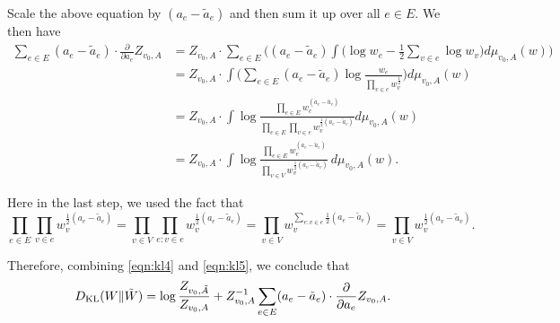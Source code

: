 \documentclass[a4paper, 11pt]{article}
\newcommand{\dkl}{D_{\textnormal{KL}}}
\begin{document}
Scale the above equation by $(a_e-\tilde{a}_e)$ and then sum it up over all $e\in E$. We then have
\begin{align}
\label{eqn:kl5}
\sum_{e\in E}(a_e-\tilde{a}_e)\cdot \frac{\partial}{\partial a_e}Z_{v_0, A}
&= Z_{v_0, A}\cdot\sum_{e\in E}\bigg((a_e-\tilde{a}_e)\int\bigg(\log w_e-\frac{1}{2}\sum_{v\in e}\log w_v\bigg)d\mu_{v_0,A}(w)\bigg)\nonumber \\
&= Z_{v_0, A}\cdot\int \bigg(\sum_{e\in E}(a_e-\tilde{a}_e)\log \frac{w_e}{\prod_{v\in e}w_v^{\frac{1}{2}}} \bigg) d\mu_{v_0,A}(w)\nonumber \\
&= Z_{v_0, A}\cdot\int \log \frac{\prod_{e\in E}w_e^{(a_e-\tilde{a}_e)}}{\prod_{e\in E}\prod_{v\in e}w_v^{\frac{1}{2}(a_e-\tilde{a}_e)}} d\mu_{v_0,A}(w)\nonumber \\
&= Z_{v_0, A}\cdot\int \log\frac{\prod_{e\in E}w_e^{(a_e-\tilde{a}_e)}}{\prod_{v\in V}w_v^{\frac{1}{2}(a_v-\tilde{a}_v)}}\,d\mu_{v_0,A}(w).
\end{align}

Here in the last step, we used the fact that 
\[\prod_{e\in E}\prod_{v\in e}w_v^{\frac{1}{2}(a_e-\tilde{a}_e)}=\prod_{v\in V}\prod_{e:v\in e}w_v^{\frac{1}{2}(a_e-\tilde{a}_e)}=\prod_{v\in V}w_v^{\sum_{e:v\in e}\frac{1}{2}(a_e-\tilde{a}_e)}=\prod_{v\in V}w_v^{\frac{1}{2}(a_v-\tilde{a}_v)}.\] 

Therefore, combining \cref{eqn:kl4} and \cref{eqn:kl5}, we conclude that
\begin{equation}
\dkl(W\|\tilde{W})=\log\frac{Z_{v_0, \tilde{A}}}{Z_{v_0, A}}+Z_{v_0,A}^{-1}\sum_{e\in E}(a_e-\tilde{a}_e)\cdot \frac{\partial}{\partial a_e}Z_{v_0, A}.\label{eqn:kl6}
\end{equation}
\end{document}

